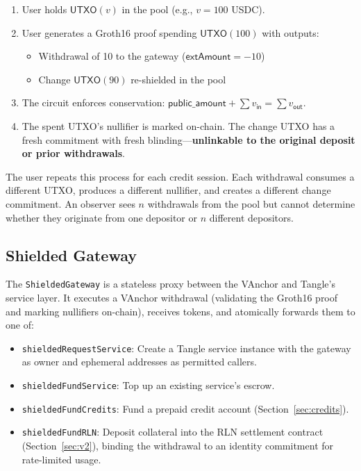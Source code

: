 \documentclass[11pt,a4paper]{article}
\theoremstyle{definition}
\begin{document}
\begin{enumerate}[nosep]
  \item User holds $\mathsf{UTXO}(v)$ in the pool (e.g., $v = 100$ USDC).
  \item User generates a Groth16 proof spending $\mathsf{UTXO}(100)$ with outputs:
  \begin{itemize}[nosep]
    \item Withdrawal of 10 to the gateway ($\mathsf{extAmount} = -10$)
    \item Change $\mathsf{UTXO}(90)$ re-shielded in the pool
  \end{itemize}
  \item The circuit enforces conservation: $\mathsf{public\_amount} + \sum v_{\mathsf{in}} = \sum v_{\mathsf{out}}$.
  \item The spent UTXO's nullifier is marked on-chain. The change UTXO has a fresh commitment with fresh blinding---\textbf{unlinkable to the original deposit or prior withdrawals}.
\end{enumerate}

The user repeats this process for each credit session. Each withdrawal consumes a different UTXO, produces a different nullifier, and creates a different change commitment. An observer sees $n$ withdrawals from the pool but cannot determine whether they originate from one depositor or $n$ different depositors.

\subsection{Shielded Gateway}

The \texttt{ShieldedGateway} is a stateless proxy between the VAnchor and Tangle's service layer. It executes a VAnchor withdrawal (validating the Groth16 proof and marking nullifiers on-chain), receives tokens, and atomically forwards them to one of:

\begin{itemize}[nosep]
  \item \texttt{shieldedRequestService}: Create a Tangle service instance with the gateway as owner and ephemeral addresses as permitted callers.
  \item \texttt{shieldedFundService}: Top up an existing service's escrow.
  \item \texttt{shieldedFundCredits}: Fund a prepaid credit account (Section~\ref{sec:credits}).
  \item \texttt{shieldedFundRLN}: Deposit collateral into the RLN settlement contract (Section~\ref{sec:v2}), binding the withdrawal to an identity commitment for rate-limited usage.
\end{itemize}
\end{document}
